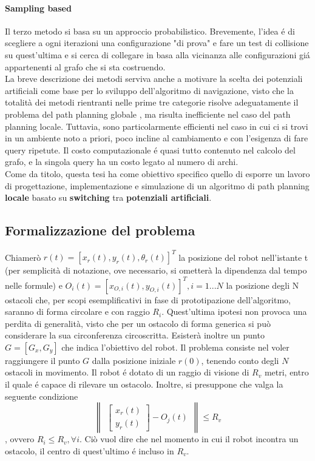 \documentclass[14pt,a4paper]{extarticle}
\begin{document}
\paragraph{Sampling based} Il terzo metodo si basa su un approccio probabilistico. Brevemente, l'idea é di scegliere a ogni iterazioni una configurazione "di prova" e fare un test di collisione su quest'ultima e si cerca di collegare in basa alla vicinanza alle configurazioni giá appartenenti al grafo che si sta costruendo. \\


La breve descrizione dei metodi serviva anche a motivare la scelta dei potenziali artificiali come base per lo sviluppo dell'algoritmo di navigazione, visto che la totalità dei metodi rientranti nelle prime tre categorie risolve adeguatamente il problema del path planning globale \cite{dalfonso}, ma risulta inefficiente nel caso del path planning locale. Tuttavia, sono particolarmente efficienti nel caso in cui ci si trovi in un ambiente noto a priori, poco incline al cambiamento e con l'esigenza di fare query ripetute. Il costo computazionale é quasi tutto contenuto nel calcolo del grafo, e la singola query ha un costo legato al numero di archi.\\
Come da titolo, questa tesi ha come obiettivo specifico quello di esporre un lavoro di progettazione, implementazione e simulazione di un algoritmo di path planning \textbf{locale} basato su \textbf{switching} tra \textbf{potenziali artificiali}. 

\subsection{Formalizzazione del problema} \label{problema}

Chiamerò \( r(t) = [x_r(t),y_r(t),\theta_r(t)]^T\) la posizione del robot nell'istante t (per semplicità di notazione, ove necessario, si ometterà la dipendenza dal tempo nelle formule) e \( O_i(t) = [x_{O,i}(t),y_{O,i}(t)]^T, i = 1...N\) la posizione degli N ostacoli che, per scopi esemplificativi in fase di prototipazione dell'algoritmo, saranno di forma circolare e con raggio \(R_i\). Quest'ultima ipotesi non provoca una perdita di generalità, visto che per un ostacolo di forma generica si può considerare la sua circonferenza circoscritta. Esisterà inoltre un punto \(G = [G_x, G_y]\) che indica l'obiettivo del robot. Il problema consiste nel voler raggiungere il punto \(G\) dalla posizione iniziale \(r(0)\), tenendo conto degli \(N\) ostacoli in movimento. Il robot é dotato di un raggio di visione di \(R_v\) metri, entro il quale é capace di rilevare un ostacolo. Inoltre, si presuppone che valga la seguente condizione
\[\begin{Vmatrix}\begin{bmatrix} x_r(t)\\ y_r(t) \end{bmatrix} - O_j(t)\end{Vmatrix} \leq R_v \], ovvero \( R_i \leq R_v, \forall i\). Ciò vuol dire che nel momento in cui il robot incontra un ostacolo, il centro di quest'ultimo é incluso in \(R_v\).
\end{document}
